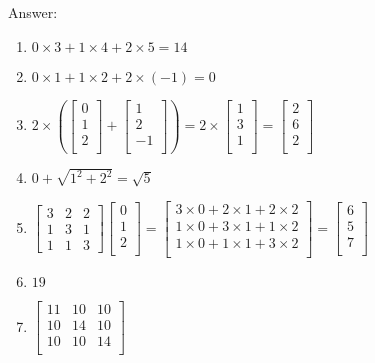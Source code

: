 \documentclass{article}
\def\red#1{{\color{red}#1}}
\def\enum#1{\begin{enumerate}#1\end{enumerate}}
\begin{document}
\red{Answer: \enum{
  \item $0\times3+1\times4+2\times5 = 14$
  \item $0\times 1+1\times2 + 2\times(-1) = 0$
  \item $2\times \left(\left[\begin{array}{c}
0\\
1\\
2\\
\end{array}\right] + \left[\begin{array}{c}
1\\
2\\
-1\\
\end{array}\right]\right) = 2\times\left[\begin{array}{c}
1\\
3\\
1\\
\end{array}\right]=\left[\begin{array}{c}
2\\
6\\
2\\
\end{array}\right] $
\item $0+\sqrt{1^2+2^2}=\sqrt{5}$
\item $\left[\begin{array}{ccc}
3 & 2 & 2\\
1 & 3 & 1\\
1 & 1 & 3
\end{array}\right]\left[\begin{array}{c}
0\\
1\\
2\\
\end{array}\right]=\left[\begin{array}{c}
3\times 0+2\times 1+2\times2\\
1\times 0+3\times1+1\times2\\
1\times 0+1\times1+3\times2\\
\end{array}\right]=\left[\begin{array}{c}
6\\
5\\
7\\
\end{array}\right]$
\item $19$
\item $\left[\begin{array}{ccc}
11 & 10 & 10\\
10 & 14 & 10\\
10 & 10 & 14\\
\end{array}\right]$
}
}
\end{document}

